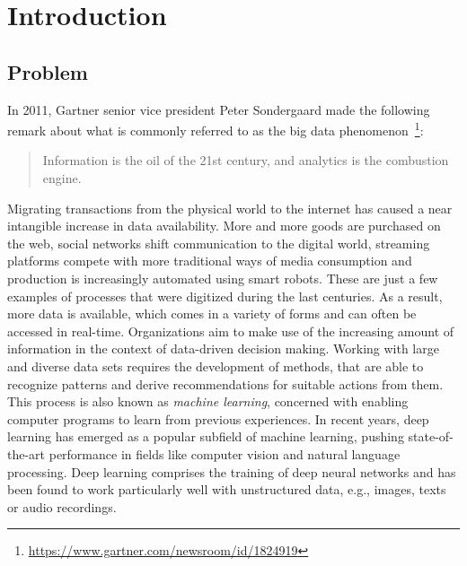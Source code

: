 \section{Introduction}

\subsection{Problem}
\label{sec:problem}

In 2011, Gartner senior vice president Peter Sondergaard made the following remark
about what is commonly referred to as the big data phenomenon~\footnote{\url{https://www.gartner.com/newsroom/id/1824919}}:

\begin{quote}
  Information is the oil of the 21st century, and analytics is the combustion engine.
\end{quote}

Migrating transactions from the physical world to the internet has caused a near
intangible increase in data availability.
More and more goods are purchased on the web, social networks shift communication
to the digital world, streaming platforms compete with more traditional ways
of media consumption and production is increasingly automated using smart robots.
These are just a few examples of processes that were digitized during the last
centuries.
As a result, more data is available, which comes in a variety of forms and
can often be accessed in real-time.
Organizations aim to make use of the increasing amount of information in the
context of data-driven decision making.
Working with large and diverse data sets requires the development of methods,
that are able to recognize patterns and derive recommendations for suitable
actions from them.
This process is also known as \textit{machine learning}, concerned with
enabling computer programs to learn from previous experiences.
In recent years, deep learning has emerged as a popular subfield of machine
learning, pushing state-of-the-art performance in fields like computer vision and
natural language processing.
Deep learning comprises the training of deep neural networks and has been found 
to work particularly well with unstructured data, e.g., images, texts or audio 
recordings.

